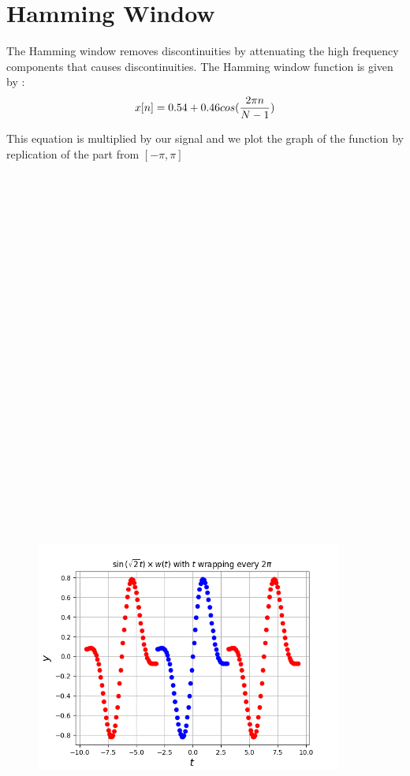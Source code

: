 \documentclass[10pt,a4paper]{article}
\begin{document}
\section{Hamming Window}
The Hamming window removes discontinuities by attenuating the high frequency components that causes discontinuities. The Hamming window function is given by :  \\

\begin{equation*}
x[n] = 0.54 + 0.46\\cos(\frac{2\pi n}{N-1}) 
\end{equation*}

This equation is multiplied by our signal and we plot the graph of the function by replication of the part from $[-\pi, \pi]$ \\\\\\\\\\\\\\\\\\\\\\\\\\\\\\\\\\\\\\\\\\\\\\\\\\

\begin{figure}[!tbh]

\includegraphics[width = 0.9\textwidth]{1-time function by replication of the part after windowing}

\end{figure}
\end{document}
